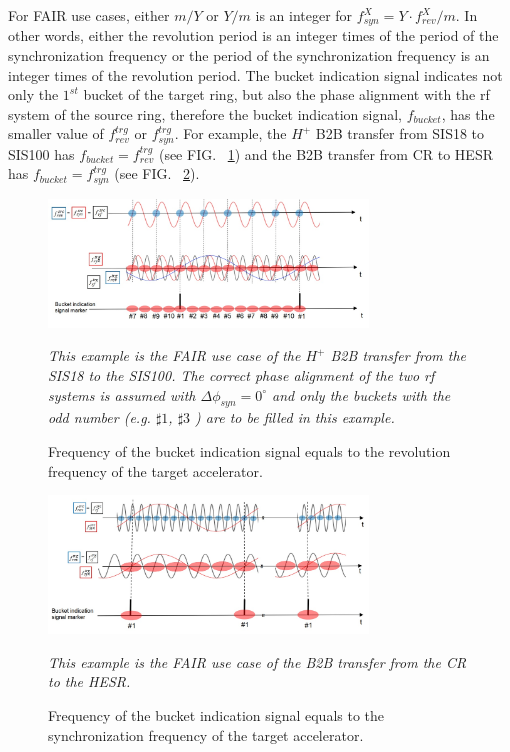 For FAIR use cases, either $m/Y$ or $Y/m$ is an integer for $f_\mathit{syn}^{X}=Y\cdot f_\mathit{rev}^{X}/m$. In other words, either the revolution period is an integer times of the period of the synchronization frequency or the period of the synchronization frequency is an integer times of the revolution period. The bucket indication signal indicates not only the $1^\mathit{st}$ bucket of the target ring, but also the phase alignment with the rf system of the source ring, therefore the bucket indication signal, $f_\mathit{bucket}$, has the smaller value of $f_\mathit{rev}^{trg}$ or $f_\mathit{syn}^{trg}$. For example, the $H^+$ B2B transfer from SIS18 to SIS100 has $f_\mathit{bucket}=f_\mathit{rev}^{trg}$ (see FIG. ~\ref{bucket_label_occurrence}) and the B2B transfer from CR to HESR has $f_\mathit{bucket}=f_\mathit{syn}^{trg}$ (see FIG. ~\ref{bucket_label_occurrence1}). 
\begin{figure}[!htb]
   \centering   
   \includegraphics*[width=85mm]{bucket_label_occurrence.jpg}
   \caption{Frequency of the bucket indication signal equals to the revolution frequency of the target accelerator.}
	{\textsl{\small{This example is the FAIR use case of the $H^+$ B2B transfer from the SIS18 to the SIS100. The correct phase alignment of the two rf systems is assumed with $\Delta\phi_\mathit{syn}=0^\circ$ and only the buckets with the odd number (e.g. $\sharp1$, $\sharp3$ ) are to be filled in this example.}}}
   \label{bucket_label_occurrence}
\end{figure}

\begin{figure}[!htb]
   \centering   
   \includegraphics*[width=85mm]{bucket_label_occurrence1.jpg}
   \caption{Frequency of the bucket indication signal equals to the synchronization frequency of the target accelerator.}
	{\textsl{\small{This example is the FAIR use case of the B2B transfer from the CR to the HESR. }}}
   \label{bucket_label_occurrence1}
\end{figure}

